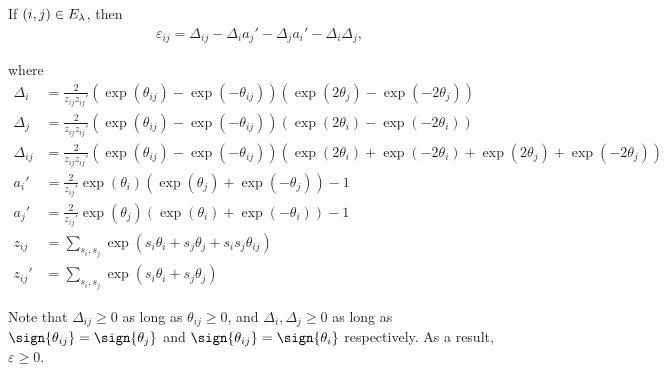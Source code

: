 \begin{lemma}
If $(i, j) \in E_{\lambda}$, then
\begin{align}
    \varepsilon_{ij} = \Delta_{ij} - \Delta_i a_j' - \Delta_j a_i' - \Delta_i \Delta_j,
\end{align}

where
\begin{align}
    \Delta_i &= \frac{2}{z_{ij} z_{ij}'} (\exp(\theta_{ij}) - \exp(-\theta_{ij})) (\exp(2\theta_j) - \exp(-2\theta_j)) \\
    \Delta_j &= \frac{2}{z_{ij} z_{ij}'} (\exp(\theta_{ij}) - \exp(-\theta_{ij})) (\exp(2\theta_i) - \exp(-2\theta_i)) \\
    \Delta_{ij} &= \frac{2}{z_{ij} z_{ij}'} (\exp(\theta_{ij}) - \exp(-\theta_{ij})) (\exp(2\theta_i) + \exp(-2\theta_i) + \exp(2\theta_j) + \exp(-2\theta_j)) \\
    a_i' &= \frac{2}{z_{ij}'} \exp(\theta_i) (\exp(\theta_j) + \exp(-\theta_j)) - 1 \\
    a_j' &= \frac{2}{z_{ij}'} \exp(\theta_j) (\exp(\theta_i) + \exp(-\theta_i)) - 1 \\
    z_{ij} &= \sum_{{s_i, s_j}} \exp(s_i \theta_i + s_j \theta_j + s_i s_j \theta_{ij}) \\
    z_{ij}' &=  \sum_{{s_i, s_j}} \exp(s_i \theta_i + s_j \theta_j)
\end{align}


Note that $\Delta_{ij} \ge 0$ as long as $\theta_{ij} \ge 0$, and $\Delta_i, \Delta_j \ge 0$ as long as $\sign{\theta_{ij}} = \sign{\theta_j}$ and $\sign{\theta_{ij}} = \sign{\theta_i}$ respectively. As a result, $\varepsilon \ge 0$.

\label{lemma:varepsilon}

\end{lemma}


